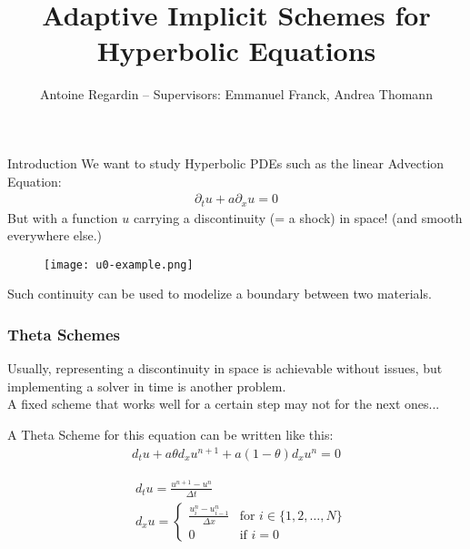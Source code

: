 \documentclass[10pt]{beamer}
\title[Adaptive Implicit Schemes for Hyperbolic Equations]{Adaptive Implicit Schemes for Hyperbolic Equations}
\author[]{Antoine Regardin -- Supervisors: Emmanuel Franck, Andrea Thomann}
\begin{document}
\frame{\titlepage}

\begin{frame}{Introduction}
    We want to study Hyperbolic PDEs such as the linear Advection Equation:
    \begin{align*}
        \partial_t u + a\partial_x u = 0
    \end{align*}
    But with a function $u$ carrying a discontinuity (= a shock) in space! (and smooth everywhere else.)
    \begin{figure}
        \centering
        \texttt{[image: u0-example.png]}
    \end{figure}
    Such continuity can be used to modelize a boundary between two materials.
\end{frame}

\begin{frame}
\frametitle{Theta Schemes}
Usually, representing a discontinuity in space is achievable without issues, but implementing a solver in time is another problem. %
\\ A fixed scheme that works well for a certain step may not for the next ones...
\vspace{12pt}

A Theta Scheme for this equation can be written like this:
\begin{align*}
    d_t u + a\theta d_x u^{n+1} + a(1-\theta) d_x u^n = 0
\end{align*}

\begin{align*}
    & d_t u = \frac{u^{n+1} - u^n}{\Delta t} \\
    & d_x u = 
    \begin{cases} 
        \frac{u_{i}^n - u_{i-1}^n}{\Delta x} & \text{for } i \in \{1, 2, \ldots, N\} \\
        0 & \text{if } i = 0 
    \end{cases}
\end{align*}


\end{frame}
\end{document}
